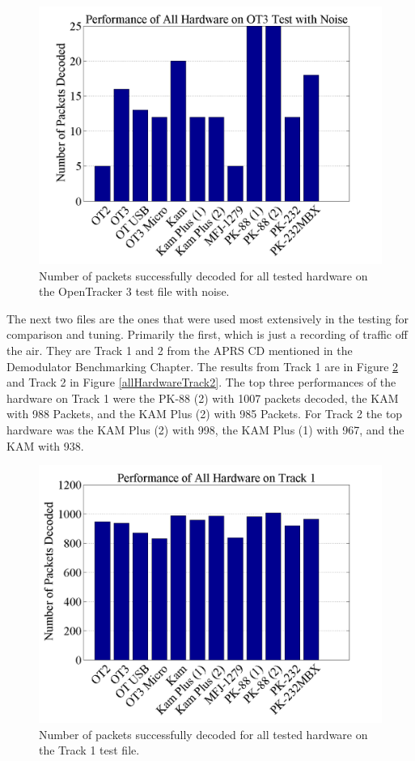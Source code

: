  \begin{figure}
  \centering
	\includegraphics[width=0.75\linewidth]{images/PerformanceofAllHardwareonOT3TestwithNoise.png} 
	\caption{Number of packets successfully decoded for all tested hardware on the OpenTracker 3 test file with noise.}
   \label{allHardwareOT3Noise}
\end{figure}

The next two files are the ones that were used most extensively in the testing for comparison and tuning. Primarily the first, which is just a recording of traffic off the air. They are Track 1 and 2 from the APRS CD mentioned in the Demodulator Benchmarking Chapter. The results from Track 1 are in Figure \ref{allHardwareTrack1} and Track 2 in Figure \ref{allHardwareTrack2}. The top three performances of the hardware on Track 1 were the PK-88 (2) with 1007 packets decoded, the KAM with 988 Packets, and the KAM Plus (2) with 985 Packets. For Track 2 the top hardware was the KAM Plus (2) with 998, the KAM Plus (1) with 967, and the KAM with 938.

 \begin{figure}
  \centering
	\includegraphics[width=0.75\linewidth]{images/PerformanceofAllHardwareonTrack1.png} 
	\caption{Number of packets successfully decoded for all tested hardware on the Track 1 test file.}
   \label{allHardwareTrack1}
\end{figure}

